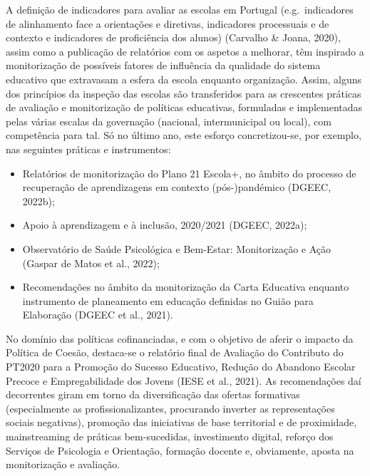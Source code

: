 \documentclass[
]{book}
\providecommand{\tightlist}{%
  \setlength{\itemsep}{0pt}\setlength{\parskip}{0pt}}
\begin{document}
A definição de indicadores para avaliar as escolas em Portugal (e.g.~indicadores de alinhamento face a orientações e diretivas, indicadores processuais e de contexto e indicadores de proficiência dos alunos) (Carvalho \& Joana, 2020), assim como a publicação de relatórios com os aspetos a melhorar, têm inspirado a monitorização de possíveis fatores de influência da qualidade do sistema educativo que extravasam a esfera da escola enquanto organização. Assim, alguns dos princípios da inspeção das escolas são transferidos para as crescentes práticas de avaliação e monitorização de políticas educativas, formuladas e implementadas pelas várias escalas da governação (nacional, intermunicipal ou local), com competência para tal. Só no último ano, este esforço concretizou-se, por exemplo, nas seguintes práticas e instrumentos:

\begin{itemize}
\tightlist
\item
  Relatórios de monitorização do Plano 21 Escola+, no âmbito do processo de recuperação de aprendizagens em contexto (pós-)pandémico (DGEEC, 2022b);
\item
  Apoio à aprendizagem e à inclusão, 2020/2021 (DGEEC, 2022a);
\item
  Observatório de Saúde Psicológica e Bem-Estar: Monitorização e Ação (Gaspar de Matos et al., 2022);
\item
  Recomendações no âmbito da monitorização da Carta Educativa enquanto instrumento de planeamento em educação definidas no Guião para Elaboração (DGEEC et al., 2021).
\end{itemize}

No domínio das políticas cofinanciadas, e com o objetivo de aferir o impacto da Política de Coesão, destaca-se o relatório final de Avaliação do Contributo do PT2020 para a Promoção do Sucesso Educativo, Redução do Abandono Escolar Precoce e Empregabilidade dos Jovens (IESE et al., 2021). As recomendações daí decorrentes giram em torno da diversificação das ofertas formativas (especialmente as profissionalizantes, procurando inverter as representações sociais negativas), promoção das iniciativas de base territorial e de proximidade, mainstreaming de práticas bem-sucedidas, investimento digital, reforço dos Serviços de Psicologia e Orientação, formação docente e, obviamente, aposta na monitorização e avaliação.
\end{document}

